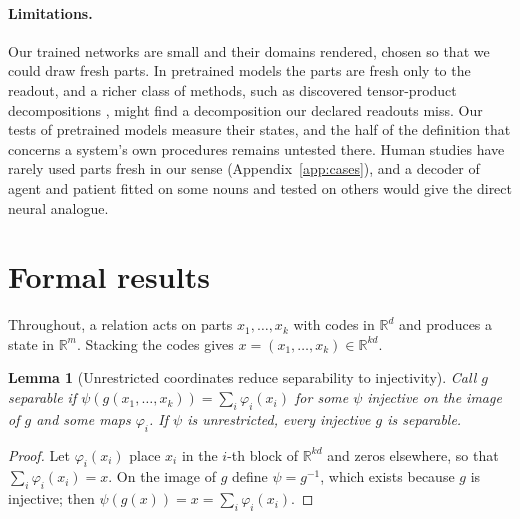 \documentclass[10pt]{article}
\theoremstyle{plain}
\newtheorem{lemma}{Lemma}
\theoremstyle{remark}
\newcommand{\R}{\mathbb{R}}
\begin{document}
\paragraph{Limitations.} Our trained networks are small and their domains rendered, chosen so that we could draw fresh parts. In pretrained models the parts are fresh only to the readout, and a richer class of methods, such as discovered tensor-product decompositions \citep{soulos2020}, might find a decomposition our declared readouts miss. Our tests of pretrained models measure their states, and the half of the definition that concerns a system's own procedures remains untested there. Human studies have rarely used parts fresh in our sense (Appendix~\ref{app:cases}), and a decoder of agent and patient \citep{frankland2015} fitted on some nouns and tested on others would give the direct neural analogue.

\FloatBarrier



\clearpage
\appendix
{}

\section{Formal results}
\label{app:proofs}

Throughout, a relation acts on parts $x_1, \ldots, x_k$ with codes in $\R^d$ and produces a state in $\R^m$. Stacking the codes gives $x = (x_1, \ldots, x_k) \in \R^{kd}$.



\begin{lemma}[Unrestricted coordinates reduce separability to injectivity]
\label{lem:psi}
Call $g$ separable if $\psi(g(x_1, \ldots, x_k)) = \sum_i \varphi_i(x_i)$ for some $\psi$ injective on the image of $g$ and some maps $\varphi_i$. If $\psi$ is unrestricted, every injective $g$ is separable.
\end{lemma}

\begin{proof}
Let $\varphi_i(x_i)$ place $x_i$ in the $i$-th block of $\R^{kd}$ and zeros elsewhere, so that $\sum_i \varphi_i(x_i) = x$. On the image of $g$ define $\psi = g^{-1}$, which exists because $g$ is injective; then $\psi(g(x)) = x = \sum_i \varphi_i(x_i)$.
\end{proof}
\end{document}
